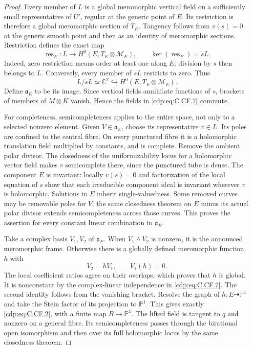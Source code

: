 \begin{proof}
Every member of $L$ is a global meromorphic vertical field
on a sufficiently small representative of $U'$, regular at
the generic point of $E$. Its restriction is therefore a
global meromorphic section of $T_E$. Tangency follows from
$v(s)=0$ at the generic smooth point and then as an identity
of meromorphic sections. Restriction defines the exact map
\[
 \operatorname{res}_E:L\longrightarrow
 H^0(E,T_E\otimes\mathcal M_E),
 \qquad
 \ker(\operatorname{res}_E)=sL.
 \tag{C.CF.6}\label{cdp:eq:C.CF.6}
\]
Indeed, zero restriction means order at least one along $E$;
division by $s$ then belongs to $L$. Conversely, every member
of $sL$ restricts to zero. Thus
\[
                  L/sL\simeq\mathbb C^2
                    \hookrightarrow
                  H^0(E,T_E\otimes\mathcal M_E).
 \tag{C.CF.7}\label{cdp:eq:C.CF.7}
\]
Define $\mathfrak a_E$ to be its image. Since vertical fields
annihilate functions of $s$, brackets of members of
$M\otimes K$ vanish. Hence the fields in \eqref{cdp:eq:C.CF.7} commute.

For completeness, semicompleteness applies to the entire
space, not only to a selected nonzero element. Given
$V\in\mathfrak a_E$, choose its representative $v\in L$.
Its poles are confined to the central fibre. On every
punctured fibre it is a holomorphic translation field
multiplied by constants, and is complete. Remove the
ambient polar divisor. The closedness of the
uniformizability locus for a holomorphic vector field
\cite[Theorem~3.3]{Guillot2024} makes $v$ semicomplete
there, since the punctured tube is dense. The component
$E$ is invariant: locally $v(s)=0$ and factorization of
the local equation of $s$ show that each irreducible
component ideal is invariant wherever $v$ is holomorphic.
Solutions in $E$ inherit single-valuedness. Some removed
curves may be removable poles for $V$; the same closedness
theorem on $E$ minus its actual polar divisor extends
semicompleteness across those curves. This proves the
assertion for every constant linear combination in
$\mathfrak a_E$.

Take a complex basis $V_1,V_2$ of $\mathfrak a_E$.
When $V_1\wedge V_2$ is nonzero, it is the announced
meromorphic frame. Otherwise there is a globally defined
meromorphic function $h$ with
\[
                  V_2=hV_1,
                  \qquad V_1(h)=0.
 \tag{C.CF.8}\label{cdp:eq:C.CF.8}
\]
The local coefficient ratios agree on their overlaps,
which proves that $h$ is global. It is nonconstant by
the complex-linear independence in \eqref{cdp:eq:C.CF.7}. The second
identity follows from the vanishing bracket.
Resolve the graph of $h:E\dashrightarrow\mathbb P^1$
and take the Stein factor of its projection to
$\mathbb P^1$. This gives exactly \eqref{cdp:eq:C.CF.2}, with a
finite map $B\to\mathbb P^1$. The lifted field is
tangent to $q$ and nonzero on a general fibre.
Its semicompleteness passes through the birational
open isomorphism and then over its full holomorphic
locus by the same closedness theorem.


\end{proof}
